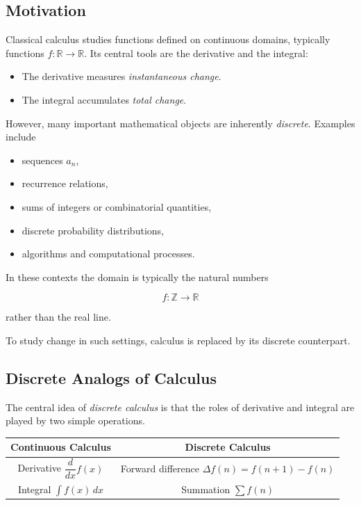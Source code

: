 
\subsection*{Motivation}

Classical calculus studies functions defined on continuous domains, typically
functions \(f : \mathbb{R} \to \mathbb{R}\).
Its central tools are the derivative and the integral:

\begin{itemize}
\item The derivative measures \emph{instantaneous change}.
\item The integral accumulates \emph{total change}.
\end{itemize}

However, many important mathematical objects are inherently \emph{discrete}.
Examples include

\begin{itemize}
\item sequences \(a_n\),
\item recurrence relations,
\item sums of integers or combinatorial quantities,
\item discrete probability distributions,
\item algorithms and computational processes.
\end{itemize}

In these contexts the domain is typically the natural numbers

\[
f : \mathbb{Z} \to \mathbb{R}
\]

rather than the real line.

To study change in such settings, calculus is replaced by its discrete
counterpart.

\subsection*{Discrete Analogs of Calculus}

The central idea of \emph{discrete calculus} is that the roles of derivative and
integral are played by two simple operations.

\begin{tcolorbox}[colback=gray!6, colframe=gray!40, arc=2pt,
  left=6pt, right=6pt, top=4pt, bottom=4pt,
  title={\small\textbf{Continuous vs.\ Discrete Calculus}},
  fonttitle=\small\bfseries]
\renewcommand{\arraystretch}{1.4}
\begin{tabular}{@{}c|c@{}}
\textbf{Continuous Calculus} & \textbf{Discrete Calculus} \\
\hline
Derivative \( \dfrac{d}{dx} f(x) \) & Forward difference \( \Delta f(n) = f(n+1)-f(n) \) \\[6pt]
Integral \( \displaystyle\int f(x)\,dx \) & Summation \( \displaystyle\sum f(n) \)
\end{tabular}
\end{tcolorbox}

